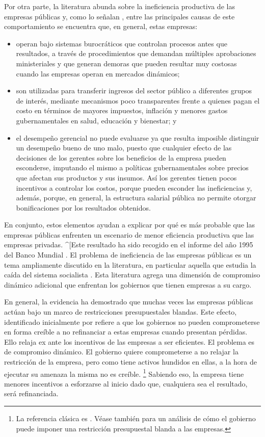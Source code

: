 \documentclass[
  12pt,
  spanish,
]{book}
\begin{document}
Por otra parte, la literatura abunda sobre la ineficiencia productiva de
las empresas públicas y, como lo señalan \citet{Jones1982}, entre las
principales causas de este comportamiento se encuentra que, en general,
estas empresas:

\begin{itemize}
\item
  operan bajo sistemas burocráticos que controlan procesos antes que
  resultados, a través de procedimientos que demandan múltiples
  aprobaciones ministeriales y que generan demoras que pueden resultar
  muy costosas cuando las empresas operan en mercados dinámicos;
\item
  son utilizadas para transferir ingresos del sector público a
  diferentes grupos de interés, mediante mecanismos poco transparentes
  frente a quienes pagan el costo en términos de mayores impuestos,
  inflación y menores gastos gubernamentales en salud, educación y
  bienestar; y
\item
  el desempeño gerencial no puede evaluarse ya que resulta imposible
  distinguir un desempeño bueno de uno malo, puesto que cualquier efecto
  de las decisiones de los gerentes sobre los beneficios de la empresa
  pueden esconderse, imputando el mismo a políticas gubernamentales
  sobre precios que afectan sus productos y sus insumos. Así los
  gerentes tienen pocos incentivos a controlar los costos, porque pueden
  esconder las ineficiencias y, además, porque, en general, la
  estructura salarial pública no permite otorgar bonificaciones por los
  resultados obtenidos.
\end{itemize}

En conjunto, estos elementos ayudan a explicar por qué es más probable
que las empresas públicas enfrenten un escenario de menor eficiencia
productiva que las empresas privadas. \^{}{[}Este resultado ha sido
recogido en el informe del año 1995 del Banco Mundial
\citep{WorldBank1995}. El problema de ineficiencia de las empresas
públicas es un tema ampliamente discutido en la literatura, en
particular aquella que estudia la caída del sistema socialista
\citep{Roland2000}. Esta literatura agrega una dimensión de compromiso
dinámico adicional que enfrentan los gobiernos que tienen empresas a su
cargo.

En general, la evidencia ha demostrado que muchas veces las empresas
públicas actúan bajo un marco de restricciones presupuestales blandas.
Este efecto, identificado inicialmente por \citet{Kornai1980} refiere a
que los gobiernos no pueden comprometerse en forma creíble a no
refinanciar a estas empresas cuando presentan pérdidas. Ello relaja ex
ante los incentivos de las empresas a ser eficientes. El problema es de
compromiso dinámico. El gobierno quiere comprometerse a no relajar la
restricción de la empresa, pero como tiene activos hundidos en ellas, a
la hora de ejecutar su amenaza la misma no es creíble. \footnote{La
  referencia clásica es \citet{Dewatripont1995}. Véase también
  \citet{Bergara2011} para un análisis de cómo el gobierno puede imponer
  una restricción presupuestal blanda a las empresas.} Sabiendo eso, la
empresa tiene menores incentivos a esforzarse al inicio dado que,
cualquiera sea el resultado, será refinanciada.
\end{document}
